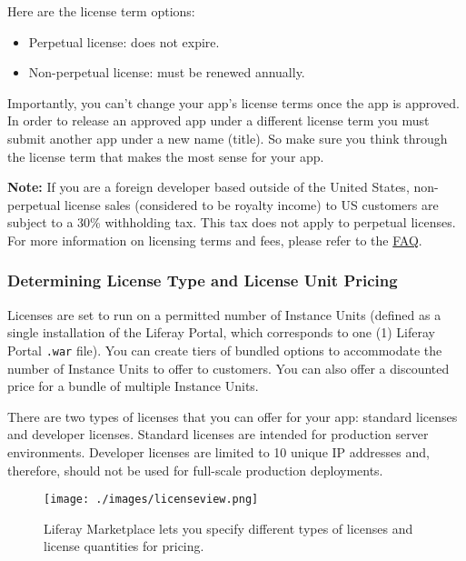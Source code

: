 Here are the license term options:

\begin{itemize}
\item
  Perpetual license: does not expire.
\item
  Non-perpetual license: must be renewed annually.
\end{itemize}

Importantly, you can't change your app's license terms once the app is
approved. In order to release an approved app under a different license
term you must submit another app under a new name (title). So make sure
you think through the license term that makes the most sense for your
app.

\noindent\hrulefill 

\textbf{Note:} If you are a foreign developer based outside of
the United States, non-perpetual license sales (considered to be royalty
income) to US customers are subject to a 30\% withholding tax. This tax
does not apply to perpetual licenses. For more information on licensing
terms and fees, please refer to the \href{/distribute/faq}{FAQ}.

\noindent\hrulefill

\subsubsection{Determining License Type and License Unit
Pricing}\label{determining-license-type-and-license-unit-pricing}

Licenses are set to run on a permitted number of Instance Units (defined
as a single installation of the Liferay Portal, which corresponds to one
(1) Liferay Portal \texttt{.war} file). You can create tiers of bundled
options to accommodate the number of Instance Units to offer to
customers. You can also offer a discounted price for a bundle of
multiple Instance Units.

There are two types of licenses that you can offer for your app:
standard licenses and developer licenses. Standard licenses are intended
for production server environments. Developer licenses are limited to 10
unique IP addresses and, therefore, should not be used for full-scale
production deployments.

\begin{figure}
\centering
\texttt{[image: ./images/licenseview.png]}
\caption{Liferay Marketplace lets you specify different types of
licenses and license quantities for pricing.}
\end{figure}

